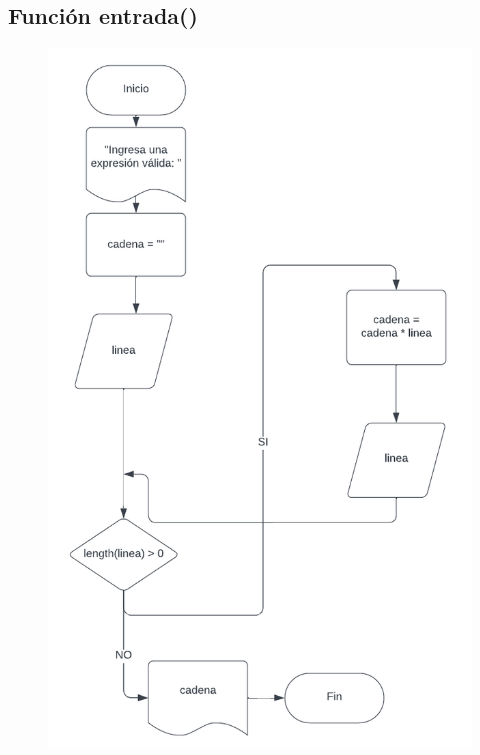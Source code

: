 \documentclass{article}
\begin{document}
\pagebreak
\subsection{Función entrada()}
\begin{figure}[h] 
	\centering 	\includegraphics[width=0.7\linewidth]{Función entrada.png}
	\label{fig:Gráfica 3}
\end{figure}


\pagebreak
\end{document}
